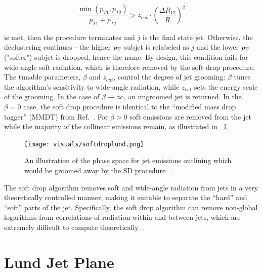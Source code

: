 \begin{equation}
  \frac{\min(p_{T1},p_{T2})}{p_{T1}+p_{T2}} > z_{cut} \cdot (\frac{\Delta R_{12}}{R})^\beta
\end{equation}

is met, then the procedure terminates and $j$ is the final state jet. Otherwise, the declustering continues - 
the higher $p_{\mathrm{T}}$ subjet is relabeled as $j$ and the lower $p_{\mathrm{T}}$ ("softer") subjet is dropped, hence the name.
By design, this condition fails for wide-angle soft radiation, which is therefore removed by the soft
drop procedure. The tunable parameters, $\beta$ and $z_{cut}$, control the degree of jet grooming:
$\beta$ tunes the algorithm's sensitivity to wide-angle radiation, while $z_{cut}$ sets the energy scale
of the grooming. In the case of $\beta \rightarrow \infty$, an ungroomed jet is returned. 
In the $\beta = 0$ case, the soft drop procedure is identical to the ``modified mass drop tagger'' (MMDT)
from Ref.~\cite{mmdt}. For $\beta > 0$  soft emissions are removed from the jet while the majority of the collinear emissions remain, as illustrated in ~\ref{fig:softdroplund}. 


\begin{figure}[htb]
\centering
\texttt{[image: visuals/softdroplund.png]}
\caption{An illustration of the phase space for jet emissions outlining which would be groomed away by the SD procedure ~\cite{softdrop}.}
\label{fig:softdroplund}
\end{figure}

The soft drop algorithm removes soft and wide-angle radiation
from jets in a very theoretically controlled manner, making it suitable to separate
the ``hard'' and ``soft'' parts of the jet. Specifically, the soft drop
algorithm can remove non-global logarithms from correlations of
radiation within and between jets, which are extremely difficult to
compute theoretically~\cite{Dasgupta:2001sh,mmdt,softdrop,Dasgupta:2013via,Dasgupta:2015yua,Larkoski:2015zka}.













\section{Lund Jet Plane}\label{sec:lundjetplane}


